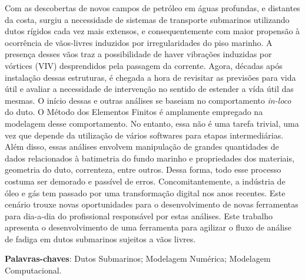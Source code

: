 
\setlength{\absparsep}{18pt} %
\begin{resumo}

    Com as descobertas de novos campos de petróleo em águas profundas, e distantes da costa, surgiu a necessidade de sistemas de transporte submarinos utilizando dutos rígidos cada vez mais extensos, e consequentemente com maior propensão à ocorrência de vãos-livres induzidos por irregularidades do piso marinho.
    A presença desses vãos traz a possibilidade de haver vibrações induzidas por vórtices (VIV) desprendidos pela passagem da corrente.
    Agora, décadas após instalação dessas estruturas, é chegada a hora de revisitar as previsões para vida útil e avaliar a necessidade de intervenção no sentido de estender a vída útil das mesmas.
    O início dessas e outras análises se baseiam no comportamento \textit{in-loco} do duto.
    O Método dos Elementos Finitos é amplamente empregado na modelagem desse comportamento.
    No entanto, essa não é uma tarefa trivial, uma vez que depende da utilização de vários softwares para etapas intermediárias.
    Além disso, essas análises envolvem manipulação de grandes quantidades de dados relacionados à batimetria do fundo marinho e propriedades dos materiais, geometria do duto, correnteza, entre outros.
    Dessa forma, todo esse processo costuma ser demorado e passível de erros.
    Concomitantemente, a indústria de óleo e gás tem passado por uma transformação digital nos anos recentes. Este cenário trouxe novas oportunidades para o desenvolvimento de novas ferramentas para dia-a-dia do profissional responsável por estas análises.
    Este trabalho apresenta o desenvolvimento de uma ferramenta para agilizar o fluxo de análise de fadiga em dutos submarinos sujeitos a vãos livres.
    

 \textbf{Palavras-chaves}: Dutos Submarinos; Modelagem Numérica; Modelagem Computacional.
\end{resumo}

